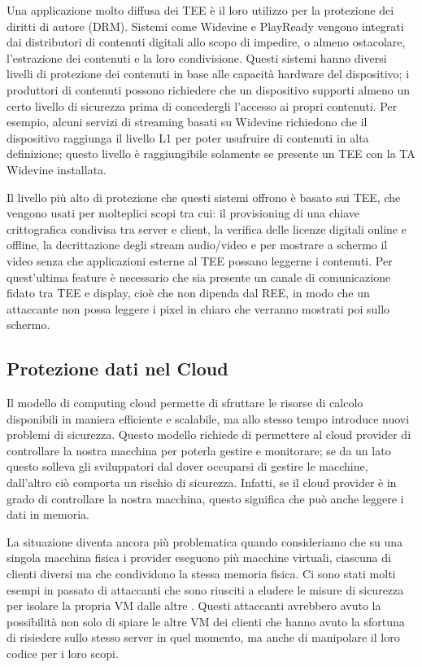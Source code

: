 \documentclass[12pt,italian]{report}
\begin{document}
Una applicazione molto diffusa dei TEE è il loro utilizzo per la protezione
dei diritti di autore (DRM). 
Sistemi come Widevine\cite{widevine} e PlayReady\cite{playready} vengono
integrati dai distributori di contenuti digitali allo scopo di impedire, o
almeno ostacolare, l'estrazione dei contenuti e la loro condivisione.
Questi sistemi hanno diversi livelli di protezione dei contenuti in base alle
capacità hardware del dispositivo; i produttori di contenuti possono richiedere
che un dispositivo supporti almeno un certo livello di sicurezza prima di
concedergli l'accesso ai propri contenuti.
Per esempio, alcuni servizi di streaming basati su Widevine richiedono che il
dispositivo raggiunga il livello L1 per poter usufruire di contenuti in alta
definizione; questo livello è raggiungibile solamente se presente un TEE con
la TA Widevine installata.

Il livello più alto di protezione che questi sistemi offrono è basato sui TEE,
che vengono usati per molteplici scopi tra cui: il provisioning di una chiave
crittografica condivisa tra server e client, la verifica delle licenze digitali
online e offline, la decrittazione degli stream audio/video e per mostrare
a schermo il video senza che applicazioni esterne al TEE possano leggerne
i contenuti.
Per quest'ultima feature è necessario che sia presente un canale di
comunicazione fidato tra TEE e display, cioè che non dipenda dal REE, in modo
che un attaccante non possa leggere i pixel in chiaro che verranno mostrati poi
sullo schermo.

\subsection{Protezione dati nel Cloud}
\label{subsec:protezione-dati-cloud}
Il modello di computing cloud permette di sfruttare le risorse di calcolo
disponibili in maniera efficiente e scalabile, ma allo stesso tempo introduce
nuovi problemi di sicurezza.
Questo modello richiede di permettere al cloud provider di controllare la
nostra macchina per poterla gestire e monitorare; se da un lato questo solleva
gli sviluppatori dal dover occuparsi di gestire le macchine, dall'altro ciò
comporta un rischio di sicurezza.
Infatti, se il cloud provider è in grado di controllare la nostra macchina,
questo significa che può anche leggere i dati in memoria.

La situazione diventa ancora più problematica quando consideriamo che su
una singola macchina fisica i provider eseguono più macchine virtuali, ciascuna
di clienti diversi ma che condividono la stessa memoria fisica.
Ci sono stati molti esempi in passato di attaccanti che sono riusciti a eludere
le misure di sicurezza per isolare la propria VM dalle altre
\cite{vmescape1}\cite{vmescape2}\cite{vmescape3}.
Questi attaccanti avrebbero avuto la possibilità non solo di spiare le altre
VM dei clienti che hanno avuto la sfortuna di risiedere sullo stesso server in
quel momento, ma anche di manipolare il loro codice per i loro scopi.
\end{document}

